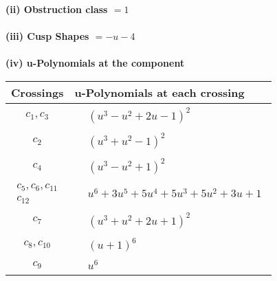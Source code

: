\documentclass[1p]{elsarticle_modified}
\theoremstyle{definition}
\begin{document}
\flushleft \textbf{(ii) Obstruction class $= 1$}\\~\\
\flushleft \textbf{(iii) Cusp Shapes $= - u-4$}\\~\\
\newpage\renewcommand{\arraystretch}{1}
\flushleft \textbf{(iv) u-Polynomials at the component}\newline \\
\begin{tabular}{m{50pt}|m{274pt}}
Crossings & \hspace{64pt}u-Polynomials at each crossing \\
\hline $$\begin{aligned}c_{1},c_{3}\end{aligned}$$&$\begin{aligned}
&(u^3- u^2+2 u-1)^2
\end{aligned}$\\
\hline $$\begin{aligned}c_{2}\end{aligned}$$&$\begin{aligned}
&(u^3+u^2-1)^2
\end{aligned}$\\
\hline $$\begin{aligned}c_{4}\end{aligned}$$&$\begin{aligned}
&(u^3- u^2+1)^2
\end{aligned}$\\
\hline $$\begin{aligned}c_{5},c_{6},c_{11}\\c_{12}\end{aligned}$$&$\begin{aligned}
&u^6+3 u^5+5 u^4+5 u^3+5 u^2+3 u+1
\end{aligned}$\\
\hline $$\begin{aligned}c_{7}\end{aligned}$$&$\begin{aligned}
&(u^3+u^2+2 u+1)^2
\end{aligned}$\\
\hline $$\begin{aligned}c_{8},c_{10}\end{aligned}$$&$\begin{aligned}
&(u+1)^6
\end{aligned}$\\
\hline $$\begin{aligned}c_{9}\end{aligned}$$&$\begin{aligned}
&u^6
\end{aligned}$\\
\hline
\end{tabular}\\~\\
\end{document}
